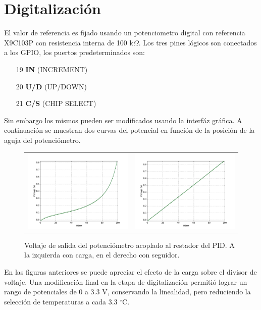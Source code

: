 \documentclass{wileysix}
\begin{document}
\section{Digitalizaci\'on}
El valor de referencia es fijado usando un potenciometro digital con referencia X9C103P \cite{digi-pot} con resistencia interna de 100 k$\Omega$. Los tres pines l\'ogicos son conectados a los GPIO, los puertos predeterminados son:
\begin{enumerate}
	\item[19] \textbf{IN} (INCREMENT) 
	\item[20] \textbf{U/D} (UP/DOWN)
	\item[21] \textbf{C/S} (CHIP SELECT)
\end{enumerate}

Sin embargo los mismos pueden ser modificados usando la interf\'az gr\'afica. A continuaci\'on se muestran dos curvas del potencial en funci\'on de la posici\'on de la aguja del potenci\'ometro.
\begin{figure}[h]
	\begin{tabular}{cc}
		\includegraphics[width=0.5\linewidth]{extras/without_follower.pdf}
		& 
		\includegraphics[width=0.5\linewidth]{extras/with_follower.pdf}
	\end{tabular}
	\caption{Voltaje de salida del potenci\'ometro acoplado al restador del PID. A la izquierda con carga, en el derecho con seguidor.}
\end{figure}

En las figuras anteriores se puede apreciar el efecto de la carga sobre el divisor de voltaje. Una modificaci\'on final en la etapa de digitalizaci\'on permiti\'o lograr un rango de potenciales de 0 a 3.3 V, conservando la linealidad, pero reduciendo la selecci\'on de temperaturas a cada 3.3 $^\circ$C.
\end{document}
